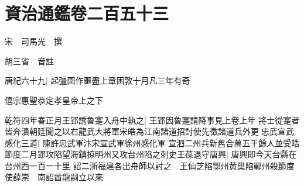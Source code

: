 \chapter{資治通鑑卷二百五十三}
宋　司馬光　撰

胡三省　音註

唐紀六十九|{
	起彊圉作噩盡上章困敦十月凡三年有奇}


僖宗惠聖恭定孝皇帝上之下

乾符四年春正月王郢誘魯寔入舟中執之|{
	王郢因魯寔請降事見上卷上年}
將士從寔者皆奔潰朝廷聞之以右龍武大將軍宋皓為江南諸道招討使先徵諸道兵外更忠武宣武感化三道|{
	陳許忠武軍汴宋宣武軍徐州感化軍}
宣泗二州兵新舊合萬五千餘人並受皓節度二月郢攻陷望海鎮掠明州又攻台州陷之刺史王葆退守唐興|{
	唐興即今天台縣在台州西一百一十里}
詔二浙福建各出舟師以討之　王仙芝陷鄂州黄巢陷鄆州殺節度使薛崇　南詔酋龍嗣立以來

